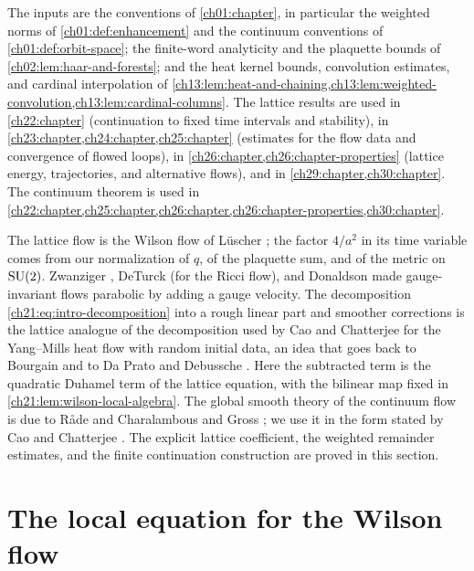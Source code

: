 The inputs are the conventions of \cref{ch01:chapter}, in particular the weighted norms of \cref{ch01:def:enhancement} and the continuum conventions of \cref{ch01:def:orbit-space}; the finite-word analyticity and the plaquette bounds of \cref{ch02:lem:haar-and-forests}; and the heat kernel bounds, convolution estimates, and cardinal interpolation of \cref{ch13:lem:heat-and-chaining,ch13:lem:weighted-convolution,ch13:lem:cardinal-columns}. The lattice results are used in \cref{ch22:chapter} (continuation to fixed time intervals and stability), in \cref{ch23:chapter,ch24:chapter,ch25:chapter} (estimates for the flow data and convergence of flowed loops), in \cref{ch26:chapter,ch26:chapter-properties} (lattice energy, trajectories, and alternative flows), and in \cref{ch29:chapter,ch30:chapter}. The continuum theorem is used in \cref{ch22:chapter,ch25:chapter,ch26:chapter,ch26:chapter-properties,ch30:chapter}.

The lattice flow is the Wilson flow of L\"uscher \cite{Luscher2010WilsonFlow,Luscher2010a}; the factor $4/a^2$ in its time variable comes from our normalization of $q$, of the plaquette sum, and of the metric on $\mathrm{SU}(2)$. Zwanziger \cite{Zwanziger1981}, DeTurck \cite{DeTurck1983} (for the Ricci flow), and Donaldson \cite{Donaldson1985} made gauge-invariant flows parabolic by adding a gauge velocity. The decomposition \eqref{ch21:eq:intro-decomposition} into a rough linear part and smoother corrections is the lattice analogue of the decomposition used by Cao and Chatterjee \cite[\S\S1.1 and 2.1]{CCHeat2022v4} for the Yang--Mills heat flow with random initial data, an idea that goes back to Bourgain \cite{Bourgain1996} and to Da Prato and Debussche \cite{DaPratoDebussche2003}. Here the subtracted term is the quadratic Duhamel term of the lattice equation, with the bilinear map fixed in \cref{ch21:lem:wilson-local-algebra}. The global smooth theory of the continuum flow is due to R\aa de \cite{Rade1992} and Charalambous and Gross \cite{CharalambousGross2013}; we use it in the form stated by Cao and Chatterjee \cite{CCState2023v4,CCHeat2022v4}. The explicit lattice coefficient, the weighted remainder estimates, and the finite continuation construction are proved in this section.

\section{The local equation for the Wilson flow}\label{ch21:sec:equation}

